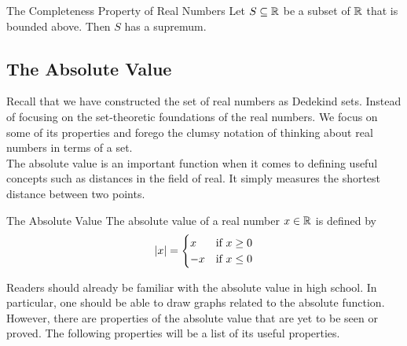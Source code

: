 \documentclass[a4paper]{article}
\begin{document}
\begin{thm}{The Completeness Property of Real Numbers}{} Let $S\subseteq\mathbb{R}$ be a subset of $\mathbb{R}$ that is bounded above. Then $S$ has a supremum. 
\end{thm}

\subsection{The Absolute Value}
Recall that we have constructed the set of real numbers as Dedekind sets. Instead of focusing on the set-theoretic foundations of the real numbers. We focus on some of its properties and forego the clumsy notation of thinking about real numbers in terms of a set. \\

The absolute value is an important function when it comes to defining useful concepts such as distances in the field of real. It simply measures the shortest distance between two points. 

\begin{defn}{The Absolute Value}{} The absolute value of a real number $x\in\mathbb{R}$ is defined by
$$\abs{x}=\begin{cases}
x & \text{if $x\geq0$} \\
-x & \text{if $x\leq0$}
\end{cases}$$
\end{defn}

Readers should already be familiar with the absolute value in high school. In particular, one should be able to draw graphs related to the absolute function. However, there are properties of the absolute value that are yet to be seen or proved. The following properties will be a list of its useful properties. 
\end{document}
